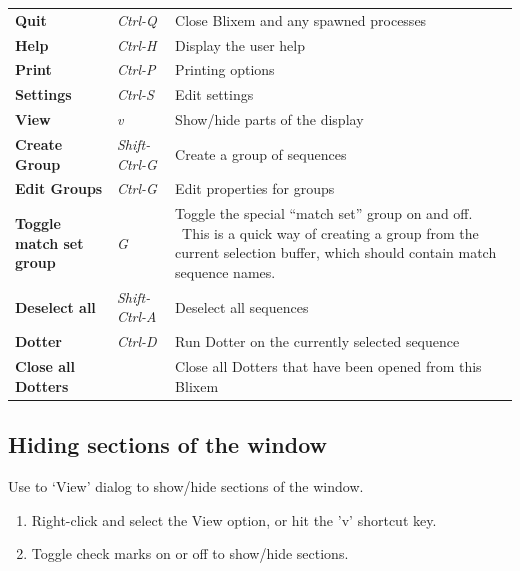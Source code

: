 \documentclass[letterpaper]{article}
\newcommand\liststyleWWviiiNumxxxi{%
\renewcommand\theenumi{\arabic{enumi}}
\renewcommand\theenumii{\alph{enumii}}
\renewcommand\theenumiii{\roman{enumiii}}
\renewcommand\theenumiv{\arabic{enumiv}}
\renewcommand\labelenumi{\theenumi.}
\renewcommand\labelenumii{\theenumii.}
\renewcommand\labelenumiii{\theenumiii.}
\renewcommand\labelenumiv{\theenumiv.}
}
\begin{document}
\begin{center}
\tablehead{}
\begin{supertabular}{p{2.9559999cm}p{2.187cm}p{8.343cm}}
\bfseries Quit &
\itshape Ctrl-Q &
 Close Blixem and any spawned processes\\
\bfseries Help &
\itshape Ctrl-H &
 Display the user help\\
 \textbf{Print}  &
\itshape Ctrl-P &
 Printing options\\
\bfseries Settings &
\itshape Ctrl-S &
 Edit settings\\
 \textbf{View}  &
\itshape v &
 Show/hide parts of the display\\
\bfseries Create Group &
\itshape Shift-Ctrl-G &
 Create a group of sequences\\
 \textbf{Edit Groups}  &
\itshape Ctrl-G &
 Edit properties for groups\\
\bfseries Toggle match set group &
\itshape G &
 Toggle the special {\textquotedblleft}match
set{\textquotedblright} group on and off. \ This is a quick way of
creating a group from the current selection buffer, which should
contain match sequence names.\\
\bfseries Deselect all &
\itshape Shift-Ctrl-A &
 Deselect all sequences\\
 \textbf{Dotter}  &
\itshape Ctrl-D &
 Run Dotter on the currently selected sequence\\
\bfseries Close all Dotters &
~
 &
 Close all Dotters that have been opened from
this Blixem\\
\end{supertabular}
\end{center}

{\color[rgb]{0.30980393,0.5058824,0.7411765}\subsection[Hiding sections of the window]{Hiding sections of the window}}
\hypertarget{RefHeading1801056909880}{}\label{bkm:RefHeading1801056909880}{
Use to {\textquoteleft}View{\textquoteright} dialog to show/hide
sections of the window.}

\liststyleWWviiiNumxxxi
\begin{enumerate}
\item {
Right-click and select the View option, or hit the
{\textquoteright}v{\textquoteright} shortcut key.}
\item {
Toggle check marks on or off to show/hide sections.}
\end{enumerate}
\end{document}
